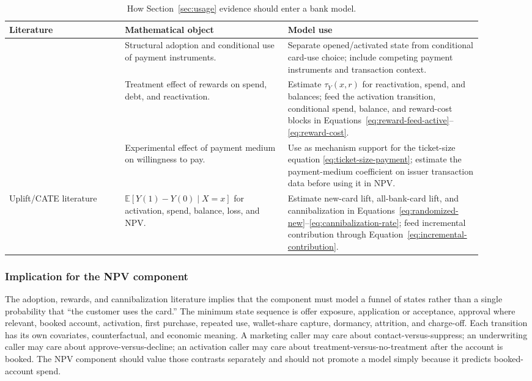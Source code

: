 \documentclass[11pt]{article}
\newcommand{\E}{\mathbb{E}}
\newcommand{\1}{\mathbf{1}}
\begin{document}
\begin{table}[t]
\centering
\caption{How Section~\ref{sec:usage} evidence should enter a bank model.}
\label{tab:usage-to-model}
\begin{tabular}{p{0.22\linewidth}p{0.31\linewidth}p{0.37\linewidth}}
\toprule
Literature & Mathematical object & Model use \\
\midrule
\citet{koulayev2012payment}
  & Structural adoption and conditional use of payment instruments.
  & Separate opened/activated state from conditional card-use choice; include
    competing payment instruments and transaction context. \\
\citet{agarwal2010rewards}
  & Treatment effect of rewards on spend, debt, and reactivation.
  & Estimate $\tau_Y(x,r)$ for reactivation, spend, and balances; feed the
    activation transition, conditional spend, balance, and reward-cost blocks
    in Equations~\eqref{eq:reward-feed-active}--\eqref{eq:reward-cost}. \\
\citet{prelec2001creditcard}
  & Experimental effect of payment medium on willingness to pay.
  & Use as mechanism support for the ticket-size equation
    \eqref{eq:ticket-size-payment}; estimate the payment-medium coefficient on
    issuer transaction data before using it in NPV. \\
Uplift/CATE literature
  & $\E[Y(1)-Y(0)\mid X=x]$ for activation, spend, balance, loss, and NPV.
  & Estimate new-card lift, all-bank-card lift, and cannibalization in
    Equations~\eqref{eq:randomized-new}--\eqref{eq:cannibalization-rate}; feed
    incremental contribution through Equation~\eqref{eq:incremental-contribution}. \\
\bottomrule
\end{tabular}
\end{table}

\subsubsection{Implication for the NPV component}
\label{subsec:usage-component-implication}

The adoption, rewards, and cannibalization literature implies that the
component must model a funnel of states rather than a single probability that
``the customer uses the card.'' The minimum state sequence is offer exposure,
application or acceptance, approval where relevant, booked account, activation,
first purchase, repeated use, wallet-share capture, dormancy, attrition, and
charge-off. Each transition has its own covariates, counterfactual, and
economic meaning. A marketing caller may care about contact-versus-suppress;
an underwriting caller may care about approve-versus-decline; an activation
caller may care about treatment-versus-no-treatment after the account is
booked. The NPV component should value those contrasts separately and should
not promote a model simply because it predicts booked-account spend.
\end{document}
